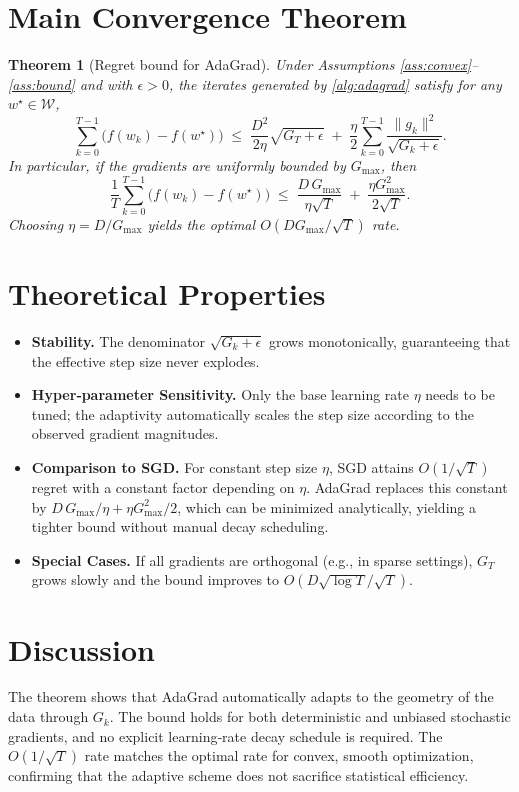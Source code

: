 \documentclass[11pt]{article}
\newtheorem{theorem}{Theorem}
\begin{document}
\section*{Main Convergence Theorem}
\begin{theorem}[Regret bound for AdaGrad]\label{thm:regret}
Under Assumptions \ref{ass:convex}--\ref{ass:bound} and with $\epsilon>0$, the iterates generated by \eqref{alg:adagrad} satisfy for any $w^{\star}\in\mathcal{W}$,
\[
\sum_{k=0}^{T-1}\bigl(f(w_k)-f(w^{\star})\bigr)
\;\le\;
\frac{D^{2}}{2\eta}\sqrt{G_T+\epsilon}
\;+\;
\frac{\eta}{2}\sum_{k=0}^{T-1}\frac{\|g_k\|^{2}}{\sqrt{G_k+\epsilon}} .
\tag{2}
\]
In particular, if the gradients are uniformly bounded by $G_{\max}$, then
\[
\frac{1}{T}\sum_{k=0}^{T-1}\bigl(f(w_k)-f(w^{\star})\bigr)
\;\le\;
\frac{D\,G_{\max}}{\eta\sqrt{T}} \;+\; \frac{\eta G_{\max}^{2}}{2\sqrt{T}} .
\tag{3}
\]
Choosing $\eta = D/G_{\max}$ yields the optimal $O(DG_{\max}/\sqrt{T})$ rate.
\end{theorem}

\section*{Theoretical Properties}
\begin{itemize}[leftmargin=*]
\item \textbf{Stability.} The denominator $\sqrt{G_k+\epsilon}$ grows monotonically, guaranteeing that the effective step size never explodes.
\item \textbf{Hyper‑parameter Sensitivity.} Only the base learning rate $\eta$ needs to be tuned; the adaptivity automatically scales the step size according to the observed gradient magnitudes.
\item \textbf{Comparison to SGD.} For constant step size $\eta$, SGD attains $O(1/\sqrt{T})$ regret with a constant factor depending on $\eta$. AdaGrad replaces this constant by $D\,G_{\max}/\eta+\eta G_{\max}^{2}/2$, which can be minimized analytically, yielding a tighter bound without manual decay scheduling.
\item \textbf{Special Cases.} If all gradients are orthogonal (e.g., in sparse settings), $G_T$ grows slowly and the bound improves to $O(D\sqrt{\log T}/\sqrt{T})$.
\end{itemize}

\section*{Discussion}
The theorem shows that AdaGrad automatically adapts to the geometry of the data through $G_k$. The bound holds for both deterministic and unbiased stochastic gradients, and no explicit learning‑rate decay schedule is required. The $O(1/\sqrt{T})$ rate matches the optimal rate for convex, smooth optimization, confirming that the adaptive scheme does not sacrifice statistical efficiency.
\end{document}
